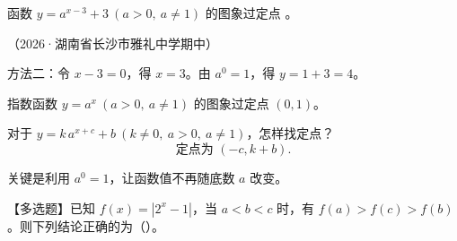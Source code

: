
\begin{frame}[t,label=A08q]
  函数 $y=a^{x-3}+3\ (a>0,\ a\ne1)$ 的图象过定点
  \underline{\hspace{2cm}}。
  \par\vspace{0.2cm}（2026·湖南省长沙市雅礼中学期中）
  \pause
  \par\vspace{0.2cm}
  方法二：令 $x-3=0$，得 $x=3$。由 $a^0=1$，得 $y=1+3=4$。
\end{frame}

\begin{frame}[t,label=A08m]
  指数函数 $y=a^x\ (a>0,\ a\ne1)$ 的图象过定点 $(0,1)$。
  \par\vspace{0.3cm}
  对于 $y=k\,a^{x+c}+b\ (k\ne0,\ a>0,\ a\ne1)$，怎样找定点？
  \pause
  \[
    \boxed{\text{定点为 }(-c,k+b).}
  \]
  \par\vspace{0.2cm}
  关键是利用 $a^0=1$，让函数值不再随底数 $a$ 改变。
\end{frame}

\begin{frame}[t,label=A09q]
  【多选题】已知 $f(x)=|2^x-1|$，当 $a<b<c$ 时，有
  $f(a)>f(c)>f(b)$。则下列结论正确的为（\quad）。
  \pause
\end{frame}

